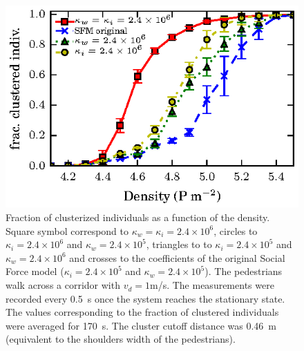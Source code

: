 \begin{figure}[htbp!]
\includegraphics[width=\columnwidth]
{plots/fracc_clusteriz_vs_density.eps}
\caption{\label{fic} Fraction of clusterized individuals as a function of the density. Square symbol correspond to $\kappa_w=\kappa_i=2.4\times 10^6$, circles to $\kappa_i=2.4\times 10^6$ and $\kappa_w=2.4\times 10^5$, triangles to to $\kappa_i=2.4\times 10^5$ and $\kappa_w=2.4\times 10^6$ and crosses to the coefficients of the original Social Force model ($\kappa_i=2.4\times 10^5$ and $\kappa_w=2.4\times 10^5$). The pedestrians walk across a corridor with $v_d=1$m/s. The measurements were recorded every 0.5~s once the system reaches the stationary state. The values corresponding to the fraction of clustered individuals were averaged for 170~s. The cluster cutoff distance was 0.46~m (equivalent to the shoulders width of the pedestrians).   }
\end{figure}







